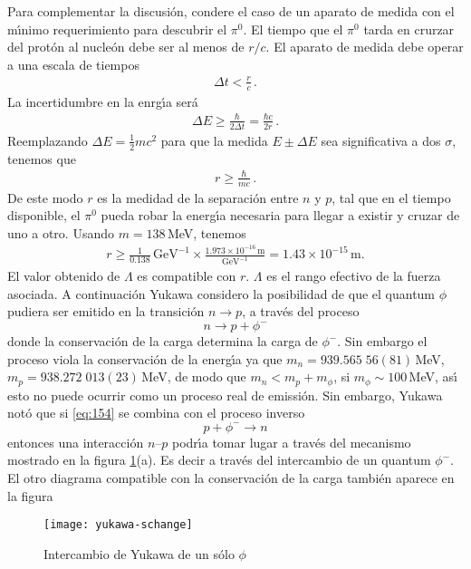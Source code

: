 Para complementar la discusi\'on, condere el caso de un aparato de medida con el m\'\i nimo requerimiento para descubrir el $\pi^0$.
El tiempo que el $\pi^0$ tarda en crurzar del prot\'on al nucle\'on debe ser al menos de $r/c$. El aparato de medida debe operar a una escala de tiempos
\begin{align}
  \Delta t<\frac{r}{c}\,.
\end{align}
La incertidumbre en la enrg\'\i a ser\'a
\begin{align}
  \Delta E\geq \frac{\hbar}{2\Delta t}=\frac{\hbar c}{2r}\,.
\end{align}
Reemplazando $\Delta E=\frac{1}{2}m c^2$ para que la medida $E\pm\Delta E$ sea significativa a dos $\sigma$, tenemos que
\begin{align}
  r\geq \frac{\hbar}{ m c}\,.
\end{align}
De este modo $r$ es la medidad de la separaci\'on entre $n$ y $p$, tal que en el tiempo disponible, el $\pi^0$ pueda robar la energ\'\i a necesaria para llegar a existir y cruzar de uno a otro. Usando $m=138\,$MeV, tenemos 
\begin{align}
  r\geq\frac{1}{0.138}\,\text{GeV}^{-1}\times\frac{1.973\times10^{-16}\,\text{m}}{\text{GeV}^{-1}}=1.43\times10^{-15}\,\text{m}.
\end{align}
El valor obtenido de $\Lambda$ es compatible con $r$. $\Lambda$ es el rango efectivo de la fuerza asociada. 
A continuaci\'on Yukawa considero la posibilidad de que el quantum $\phi$ pudiera ser emitido en la transici\'on $n\to p$, a trav\'es del proceso
\begin{equation}
  \label{eq:154}
  n\to p+\phi^-
\end{equation}
donde la conservaci\'on de la carga determina la carga de $\phi^-$. Sin embargo el proceso viola la conservaci\'on de la energ\'\i a ya que $m_n=939.565\;56(81)\,$MeV, $m_p=938.272\;013(23)\,$MeV, de modo que $m_n\lt m_p+m_\phi$, si $m_\phi\sim100\,$MeV, as\'\i{} esto no puede ocurrir como un proceso real de emissi\'on. Sin embargo, Yukawa not\'o que si \eqref{eq:154} se combina con el proceso inverso
\begin{equation}
  p+\phi^-\to n
\end{equation}
entonces una interacci\'on $n$--$p$ podr\'\i a tomar lugar a trav\'es del mecanismo mostrado en la figura \ref{fig:n-p}(a). Es decir a trav\'es del intercambio de un quantum $\phi^-$. El otro diagrama compatible con la conservaci\'on de la carga tambi\'en aparece en la figura
\begin{figure} %

\texttt{[image: yukawa-schange]} %
  \caption{Intercambio de Yukawa de un s\'olo $\phi$} %
\label{fig:n-p} %
\end{figure} %


